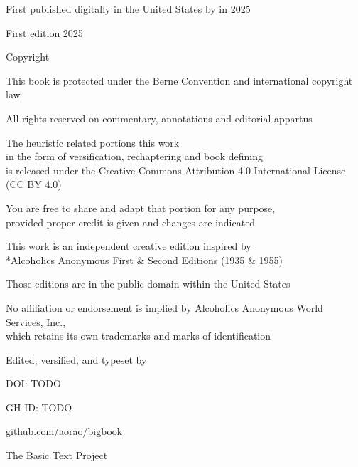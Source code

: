 \begin{legalchapter}

First published digitally in the United States by \pseudonym in 2025

First edition 2025

Copyright \textcopyright {}

This book is protected under the Berne Convention and international copyright law

All rights reserved on commentary, annotations and editorial appartus

The heuristic related portions this work \\
    in the form of versification, rechaptering and book defining \\
    is released under the Creative Commons Attribution 4.0 International License (CC BY 4.0)

You are free to share and adapt that portion for any purpose, \\
    provided proper credit is given and changes are indicated

This work is an independent creative edition inspired by \\
    *Alcoholics Anonymous First \& Second Editions (1935 \& 1955)

Those editions are in the public domain within the United States

No affiliation or endorsement is implied by Alcoholics Anonymous World Services, Inc., \\
    which retains its own trademarks and marks of identification

Edited, versified, and typeset by \pseudonym

DOI: TODO

GH-ID: TODO

github.com/aorao/bigbook

The Basic Text Project



\vfill
\bbtitle \\
\textcopyright {}

\end{legalchapter}
